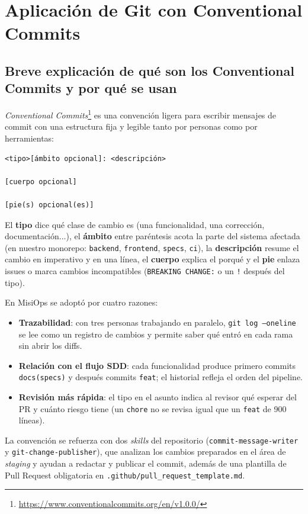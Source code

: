 \section{Aplicación de Git con Conventional Commits}

\subsection{Breve explicación de qué son los Conventional Commits y por qué se usan}
\emph{Conventional Commits}\footnote{\url{https://www.conventionalcommits.org/en/v1.0.0/}} es una convención ligera para escribir mensajes de commit con una estructura fija y legible tanto por personas como por herramientas:

\begin{lstlisting}
<tipo>[ámbito opcional]: <descripción>

[cuerpo opcional]

[pie(s) opcional(es)]
\end{lstlisting}

El \textbf{tipo} dice qué clase de cambio es (una funcionalidad, una corrección, documentación...), el \textbf{ámbito} entre paréntesis acota la parte del sistema afectada (en nuestro monorepo: \texttt{backend}, \texttt{frontend}, \texttt{specs}, \texttt{ci}), la \textbf{descripción} resume el cambio en imperativo y en una línea, el \textbf{cuerpo} explica el porqué y el \textbf{pie} enlaza issues o marca cambios incompatibles (\texttt{BREAKING CHANGE:} o un \texttt{!} después del tipo).

En MisiOps se adoptó por cuatro razones:

\begin{itemize}
    \item \textbf{Trazabilidad}: con tres personas trabajando en paralelo, \texttt{git log --oneline} se lee como un registro de cambios y permite saber qué entró en cada rama sin abrir los diffs.
    \item \textbf{Relación con el flujo SDD}: cada funcionalidad produce primero commits \texttt{docs(specs)} y después commits \texttt{feat}; el historial refleja el orden del pipeline.
    \item \textbf{Revisión más rápida}: el tipo en el asunto indica al revisor qué esperar del PR y cuánto riesgo tiene (un \texttt{chore} no se revisa igual que un \texttt{feat} de 900 líneas).
\end{itemize}

La convención se refuerza con dos \emph{skills} del repositorio (\texttt{commit\allowbreak-message\allowbreak-writer} y \texttt{git\allowbreak-change\allowbreak-publisher}), que analizan los cambios preparados en el área de \emph{staging} y ayudan a redactar y publicar el commit, además de una plantilla de Pull Request obligatoria en \texttt{.github/\allowbreak pull\_request\_template.md}.

